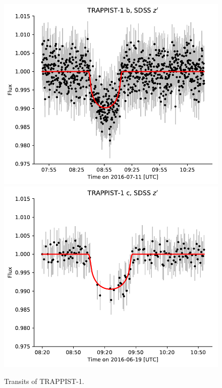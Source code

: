 \begin{figure}
\begin{center}
\includegraphics[scale=0.6]{trappist1_rn/transit_b_cropped.pdf}
\includegraphics[scale=0.6]{trappist1_rn/transit_c_cropped.pdf}
\end{center}
\caption{Transits of TRAPPIST-1.\label{fig:transits}}
\end{figure}



